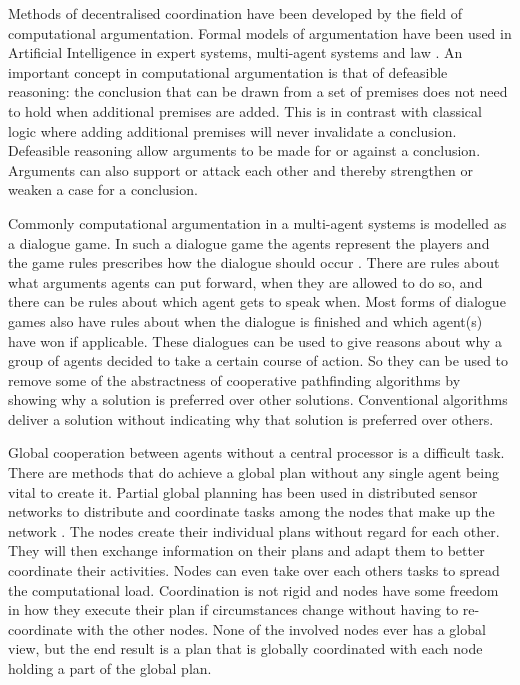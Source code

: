 Methods of decentralised coordination have been developed by the field of 
computational argumentation. Formal models of argumentation have been used in 
Artificial Intelligence in expert systems, multi-agent systems and law
\cite{vaneemeren2014,rahwan2009}. An important concept in computational 
argumentation is that of
defeasible reasoning: the conclusion that can be drawn from a set of premises
does not need to hold when additional premises are added. This is in contrast
with classical logic where adding additional premises will never invalidate a
conclusion. Defeasible reasoning allow arguments to be made for or against a
conclusion. Arguments can also support or attack each other and thereby
strengthen or weaken a case for a conclusion.

Commonly computational argumentation in a multi-agent systems is modelled as a 
dialogue game.
In such a dialogue game the agents represent the players and the game rules
prescribes how the dialogue should occur \cite{walton1995}. There are rules
about what arguments agents can put forward, when they are allowed to do so,
and there can be rules about which agent gets to speak when. Most forms of
dialogue games also have rules about when the dialogue is finished and which
agent(s) have won if applicable. These dialogues can be used to give reasons
about why a group of agents decided to take a certain course of action. So they
can be used to remove some of the abstractness of cooperative pathfinding 
algorithms by showing why a solution is preferred over other solutions. 
Conventional algorithms deliver a solution without indicating why that solution 
is preferred over others.

Global cooperation between agents without a central processor is a difficult 
task. There are methods that do achieve a global plan without any single agent 
being vital to create it.
Partial global planning has been used in distributed sensor networks to
distribute and coordinate tasks among the nodes that make up the network
\cite{durfee1991}. The nodes create their individual plans without regard for
each other. They will then exchange information on their plans and adapt them
to better coordinate their activities. Nodes can even take over each others
tasks to spread the computational load. Coordination is not rigid and nodes have
some freedom in how they execute their plan if circumstances change without
having to re-coordinate with the other nodes. None of the involved nodes ever
has a global view, but the end result is a plan that is globally coordinated
with each node holding a part of the global plan.

